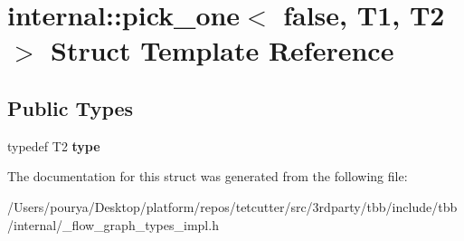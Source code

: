 \hypertarget{structinternal_1_1pick__one_3_01false_00_01T1_00_01T2_01_4}{}\section{internal\+:\+:pick\+\_\+one$<$ false, T1, T2 $>$ Struct Template Reference}
\label{structinternal_1_1pick__one_3_01false_00_01T1_00_01T2_01_4}
\subsection*{Public Types}
\begin{DoxyCompactItemize}
\item 
\hypertarget{structinternal_1_1pick__one_3_01false_00_01T1_00_01T2_01_4_a24a58f78a6a724d394e63dd4b4627c13}{}typedef T2 {\bfseries type}\label{structinternal_1_1pick__one_3_01false_00_01T1_00_01T2_01_4_a24a58f78a6a724d394e63dd4b4627c13}

\end{DoxyCompactItemize}


The documentation for this struct was generated from the following file\+:\begin{DoxyCompactItemize}
\item 
/\+Users/pourya/\+Desktop/platform/repos/tetcutter/src/3rdparty/tbb/include/tbb/internal/\+\_\+flow\+\_\+graph\+\_\+types\+\_\+impl.\+h\end{DoxyCompactItemize}
